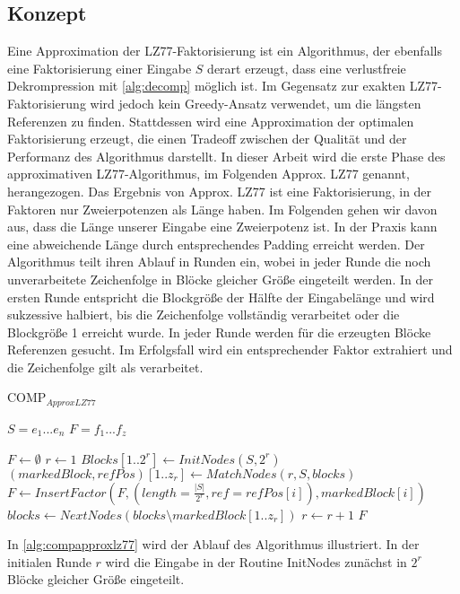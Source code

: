 \subsection{Konzept}
Eine Approximation der LZ77-Faktorisierung ist ein Algorithmus, der ebenfalls eine Faktorisierung einer Eingabe $S$ derart erzeugt, dass 
eine verlustfreie Dekrompression mit \ref{alg:decomp} möglich ist. Im Gegensatz zur exakten LZ77-Faktorisierung wird jedoch kein Greedy-Ansatz verwendet, um die längsten Referenzen
zu finden. Stattdessen wird eine Approximation der optimalen Faktorisierung erzeugt, die einen Tradeoff zwischen der Qualität und der Performanz des Algorithmus darstellt.
In dieser Arbeit wird die erste Phase des approximativen LZ77-Algorithmus, im Folgenden Approx. LZ77 genannt, herangezogen. Das Ergebnis von Approx. LZ77 ist eine Faktorisierung, in der
Faktoren nur Zweierpotenzen als Länge haben. Im Folgenden gehen wir davon aus, dass die Länge unserer Eingabe eine Zweierpotenz ist. In der Praxis kann eine abweichende Länge durch
entsprechendes Padding erreicht werden.
Der Algorithmus teilt ihren Ablauf in Runden ein, wobei in jeder Runde die noch unverarbeitete Zeichenfolge in Blöcke gleicher Größe eingeteilt werden. In der ersten Runde entspricht
die Blockgröße der Hälfte der Eingabelänge und wird sukzessive halbiert, bis die Zeichenfolge vollständig verarbeitet oder die Blockgröße 1 erreicht wurde. In jeder Runde werden für die
erzeugten Blöcke Referenzen gesucht. Im Erfolgsfall wird ein entsprechender Faktor extrahiert und die Zeichenfolge gilt als verarbeitet.
\begin{algorithm}
\centering
\caption{COMP$_{ApproxLZ77}$} \label{alg:compapproxlz77}
\algorithmicrequire $S=e_1...e_n$
\algorithmicensure $F=f_1...f_z$
\begin{algorithmic}
    \STATE $F \gets \emptyset$
    \STATE $r \gets 1$
    \STATE $Blocks[1..2^r] \gets InitNodes(S, 2^r)$ 
    \STATE $(markedBlock, refPos)[1..z_r] \gets MatchNodes(r, S, blocks)$
        \STATE $F \gets InsertFactor(F, (length=\frac{|S|}{2^r}, ref=refPos[i]), markedBlock[i])$
    \ENDFOR
    \STATE $blocks \gets NextNodes(blocks\setminus markedBlock[1..z_r])$ 
    \STATE $r \gets r+1$
    \ENDWHILE
    \RETURN $F$
\end{algorithmic}
\end{algorithm}
In \ref{alg:compapproxlz77} wird der Ablauf des Algorithmus illustriert. In der initialen Runde $r$ wird die Eingabe in der Routine InitNodes zunächst in $2^r$ Blöcke gleicher Größe eingeteilt.
